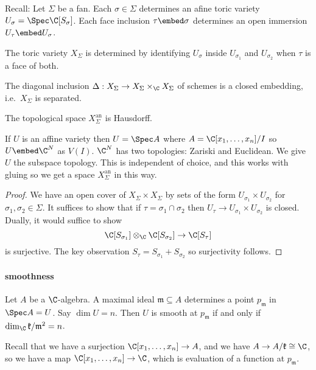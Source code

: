 \documentclass[a4paper]{article}
\begin{document}
Recall: Let \(\Sigma\) be a fan. Each \(\sigma \in \Sigma\) determines an afine toric variety \(U_\sigma = \Spec \C[S_\sigma]\). Each face inclusion \(\tau \embed \sigma\) determines an open immersion \(U_\tau \embed U_\sigma\).

The toric variety \(X_\Sigma\) is determined by identifying \(U_\sigma\) inside \(U_{\sigma_1}\) and \(U_{\sigma_2}\) when \(\tau\) is a face of both.

\begin{lemma}
  The diagonal inclusion \(\Delta: X_\Sigma \to X_\Sigma \times_\C X_\Sigma\) of schemes is a closed embedding, i.e.\ \(X_\Sigma\) is separated.

  The topological space \(X_\Sigma^{\text{an}}\) is Hausdorff.
\end{lemma}

\begin{remark}
  If \(U\) is an affine variety then \(U = \Spec A\) where \(A = \C[x_1, \dots, x_n]/I\) so \(U \embed \C^N\) as \(V(I)\). \(\C^N\) has two topologies: Zariski and Euclidean. We give \(U\) the subspace topology. This is independent of choice, and this works with gluing so we get a space \(X_\Sigma^{\text{an}}\) in this way.
\end{remark}

\begin{proof}
  We have an open cover of \(X_\Sigma \times X_\Sigma\) by sets of the form \(U_{\sigma_1} \times U_{\sigma_2}\) for \(\sigma_1, \sigma_2 \in \Sigma\). It suffices to show that if \(\tau = \sigma_1 \cap \sigma_2\) then \(U_\tau \to U_{\sigma_1} \times U_{\sigma_2}\) is closed. Dually, it would suffice to show
  \[
    \C[S_{\sigma_1}] \otimes_\C \C[S_{\sigma_2}] \to \C[S_\tau]
  \]
  is surjective. The key observation \(S_\tau = S_{\sigma_1} + S_{\sigma_2}\) so surjectivity follows.
\end{proof}

\paragraph{smoothness}

Let \(A\) be a \(\C\)-algebra. A maximal ideal \(\mathfrak m \subseteq A\) determines a point \(p_{\mathfrak m}\) in \(\Spec A = U\). Say \(\dim U = n\). Then \(U\) is smooth at \(p_{\mathfrak m}\) if and only if \(\dim_\C \mathfrak k/\mathfrak m^2 = n\).

Recall that we have a surjection \(\C[x_1, \dots, x_n] \to A\), and we have \(A \to A/\mathfrak k \cong \C\), so we have a map \(\C[x_1, \dots, x_n] \to \C\), which is evaluation of a function at \(p_{\mathfrak m}\).
\end{document}

